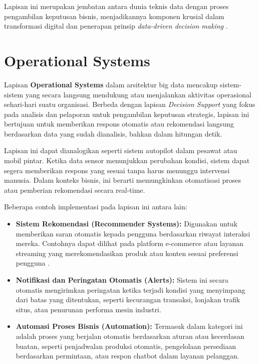Lapisan ini merupakan jembatan antara dunia teknis data dengan proses pengambilan keputusan bisnis, menjadikannya komponen krusial dalam transformasi digital dan penerapan prinsip \textit{data-driven decision making} \cite{davenport2010analytics}.


\section{Operational Systems}

Lapisan \textbf{Operational Systems} dalam arsitektur big data mencakup sistem-sistem yang secara langsung mendukung atau menjalankan aktivitas operasional sehari-hari suatu organisasi. Berbeda dengan lapisan \textit{Decision Support} yang fokus pada analisis dan pelaporan untuk pengambilan keputusan strategis, lapisan ini bertujuan untuk memberikan respons otomatis atau rekomendasi langsung berdasarkan data yang sudah dianalisis, bahkan dalam hitungan detik.

Lapisan ini dapat dianalogikan seperti sistem autopilot dalam pesawat atau mobil pintar. Ketika data sensor menunjukkan perubahan kondisi, sistem dapat segera memberikan respons yang sesuai tanpa harus menunggu intervensi manusia. Dalam konteks bisnis, ini berarti memungkinkan otomatisasi proses atau pemberian rekomendasi secara real-time.

Beberapa contoh implementasi pada lapisan ini antara lain:

\begin{itemize}
	\item \textbf{Sistem Rekomendasi (Recommender Systems):} Digunakan untuk memberikan saran otomatis kepada pengguna berdasarkan riwayat interaksi mereka. Contohnya dapat dilihat pada platform e-commerce atau layanan streaming yang merekomendasikan produk atau konten sesuai preferensi pengguna \cite{ricci2011recommender}.
	
	\item \textbf{Notifikasi dan Peringatan Otomatis (Alerts):} Sistem ini secara otomatis mengirimkan peringatan ketika terjadi kondisi yang menyimpang dari batas yang ditentukan, seperti kecurangan transaksi, lonjakan trafik situs, atau penurunan performa mesin industri.
	
	\item \textbf{Automasi Proses Bisnis (Automation):} Termasuk dalam kategori ini adalah proses yang berjalan otomatis berdasarkan aturan atau kecerdasan buatan, seperti penjadwalan produksi otomatis, pengelolaan persediaan berdasarkan permintaan, atau respon chatbot dalam layanan pelanggan.
\end{itemize}


